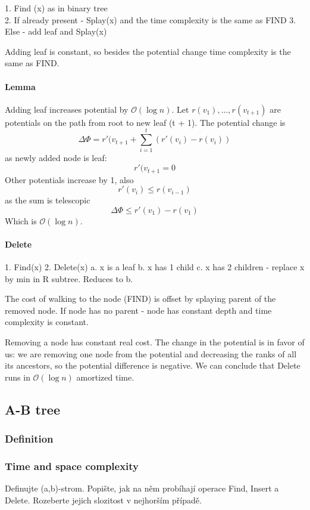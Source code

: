 \documentclass[12pt]{article}
\newcommand{\bigO}{\mathcal{O}}
\newcommand{\bigOlog}{\bigO(\log n)}
\begin{document}
1. Find (x) as in binary tree \\
2. If already present - Splay(x) and the time complexity is the same as FIND
3. Else - add leaf and Splay(x)

Adding leaf is constant, so besides the potential change time complexity is the same as FIND.

\paragraph{Lemma} Adding leaf increases potential by $\bigO(\log n)$.
Let $ r(v_1), ... , r(v_{t+1}) $ are potentials on the path from root to new leaf (t + 1). The potential change is
\[ \Delta \Phi = r'(v_{t+1} + \sum_{i = 1}^t (r'(v_i) - r(v_i)) \]
as newly added node is leaf:
\[ r'(v_{t+1} = 0 \]
Other potentials increase by 1, also
\[ r'(v_i) \leq r(v_{i - 1}) \]
as the sum is telescopic
\[ \Delta \Phi \leq r'(v_1) - r(v_1) \]
Which is $\bigOlog$.

\paragraph{Delete}

1. Find(x)
2. Delete(x)
	a. x is a leaf
	b. x has 1 child
	c. x has 2 children - replace x by min in R subtree. Reduces to b.

The cost of walking to the node (FIND) is offset by splaying parent of the removed node. If node has no parent - node has constant depth and time complexity is constant.

Removing a node has constant real cost. The change in the potential is in favor of us: we are removing one node from the potential and decreasing the ranks of all its ancestors, so the potential difference is negative.
We can conclude that Delete runs in $\bigOlog$ amortized time.

\subsection{A-B tree}

\subsubsection{Definition}
\subsubsection{Time and space complexity}

    Definujte (a,b)-strom. Popište, jak na něm probíhají operace Find, Insert a Delete. Rozeberte jejich slozitost v nejhorším případě.
\end{document}

